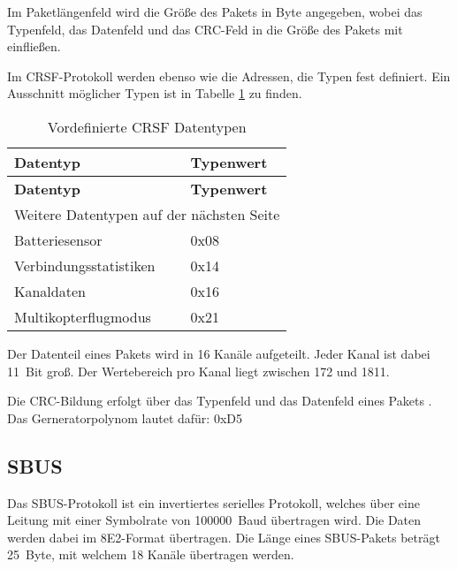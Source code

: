 Im Paketlängenfeld wird die Größe des Pakets in Byte angegeben, wobei das Typenfeld, das Datenfeld und das CRC-Feld in die Größe des Pakets mit einfließen. \cite{cleanflightCrsf}

Im CRSF-Protokoll werden ebenso wie die Adressen, die Typen fest definiert. Ein Ausschnitt möglicher Typen ist in Tabelle \ref{table:crsfTyp} zu finden.

\begin{longtable}[c]{|l|l|}
    \caption{Vordefinierte CRSF Datentypen \cite{cleanflightCrsfP}}
    \label{table:crsfTyp}\\
    \hline
    \textbf{Datentyp} & \textbf{Typenwert}\\
    \hline
    \hline
    \endfirsthead

    \hline
    \textbf{Datentyp} & \textbf{Typenwert}\\
    \hline
    \hline
    \endhead

    \hline
    \multicolumn{2}{|r|}{Weitere Datentypen auf der nächsten Seite}\\
    \hline
    \endfoot

    \hline
    \endlastfoot
    
    Batteriesensor & 0x08 \\
    \hline
    Verbindungsstatistiken & 0x14 \\
    \hline
    Kanaldaten & 0x16 \\
    \hline
    Multikopterflugmodus & 0x21 \\
\end{longtable}

Der Datenteil eines Pakets wird in 16 Kanäle aufgeteilt. Jeder Kanal ist dabei 11~Bit groß. Der Wertebereich pro Kanal liegt zwischen 172 und 1811. \cite{cleanflightCrsf}

Die CRC-Bildung erfolgt über das Typenfeld und das Datenfeld eines Pakets \cite{cleanflightCrsf}. Das Gerneratorpolynom lautet dafür: 0xD5 \cite{cleanflightCRC}

\subsection{SBUS}

Das SBUS-Protokoll ist ein invertiertes serielles Protokoll, welches über eine Leitung mit einer Symbolrate von 100000~Baud übertragen wird. Die Daten werden dabei im 8E2-Format übertragen. Die Länge eines SBUS-Pakets beträgt 25~Byte, mit welchem 18 Kanäle übertragen werden. \cite{BolderFlight}

